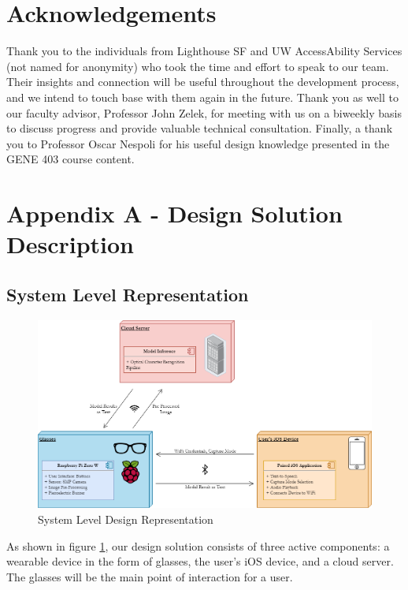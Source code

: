 \documentclass[a4paper,11pt]{article}
\begin{document}
\section{Acknowledgements}
Thank you to the individuals from Lighthouse SF and UW AccessAbility Services (not named for anonymity) who took the time and effort to speak to our team. Their insights and connection will be useful throughout the development process, and we intend to touch base with them again in the future. Thank you as well to our faculty advisor, Professor John Zelek, for meeting with us on a biweekly basis to discuss progress and provide valuable technical consultation. Finally, a thank you to Professor Oscar Nespoli for his useful design knowledge presented in the GENE 403 course content.

\newpage
\section{Appendix A - Design Solution Description}
\subsection{System Level Representation}
\label{section-system-level}

\begin{figure}[H]
\centering
\includegraphics[scale=0.45]{img/System Level.png}
\caption{System Level Design Representation}
\label{fig:system_level}
\end{figure}

\noindent
As shown in figure \ref{fig:system_level}, our design solution consists of three active components: a wearable device in the form of glasses, the user's iOS device, and a cloud server. The glasses will be the main point of interaction for a user.
\end{document}
